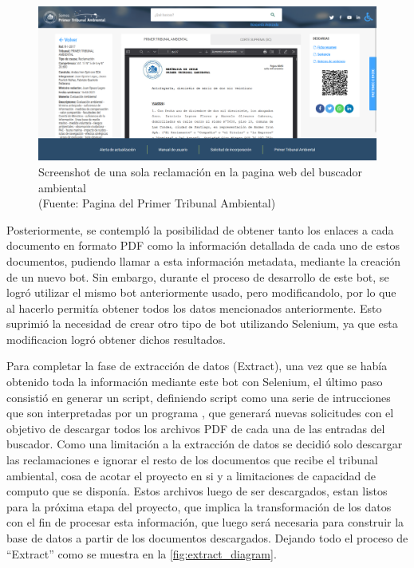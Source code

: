 \begin{figure}[ht!]
    \centering
    \includegraphics[width=.75\textwidth]{figures/huemul3.png}
    \caption[Screenshot de una sola reclamación en la pagina web del buscador ambiental]{Screenshot de una sola reclamación en la pagina web del buscador ambiental\\
    {\scriptsize (Fuente: Pagina del Primer Tribunal Ambiental)}}
    \label{fig:extract2}
\end{figure}

\newpage

Posteriormente, se contempló la posibilidad de obtener tanto los enlaces a cada documento en formato PDF como la información 
detallada de cada uno de estos documentos, pudiendo llamar a esta información metadata, mediante la creación de un nuevo bot. 
Sin embargo, durante el proceso de desarrollo de este bot, se logró utilizar el mismo bot anteriormente usado, pero modificandolo,
por lo que al hacerlo permitía obtener todos los datos mencionados anteriormente. Esto suprimió 
la necesidad de crear otro tipo de bot utilizando Selenium, ya que esta modificacion logró obtener dichos resultados.

Para completar la fase de extracción de datos (Extract), una vez que se había obtenido toda la información mediante este bot con Selenium, 
el último paso consistió en generar un script, definiendo script como una serie de intrucciones que son interpretadas por un programa \cite{techtargetWhatScript}, que generará nuevas solicitudes con el objetivo de descargar todos los archivos PDF de cada una 
de las entradas del buscador. 
Como una limitación a la extracción de datos se decidió solo descargar las reclamaciones e ignorar el resto de los documentos que recibe el tribunal ambiental, cosa de acotar el proyecto en si y a limitaciones de capacidad de computo que se disponía.
Estos archivos luego de ser descargados, estan listos para la próxima etapa del proyecto, que implica la transformación 
de los datos con el fin de procesar esta información, que luego será necesaria para construir la base de datos a partir de los documentos descargados.
Dejando todo el proceso de ``Extract'' como se muestra en la \autoref{fig:extract_diagram}. 

